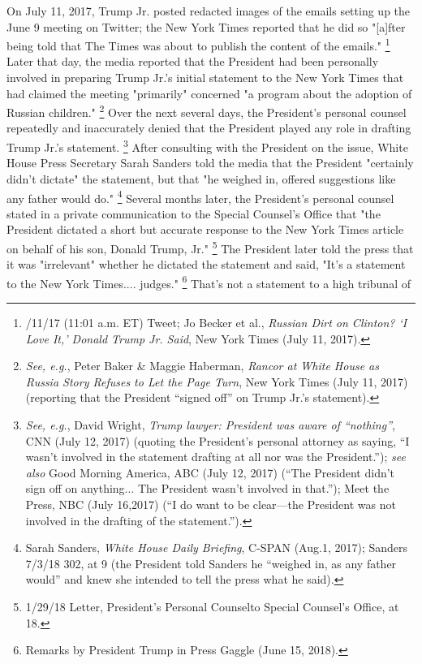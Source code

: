 On July 11, 2017, Trump Jr. posted redacted images of the emails setting up the June 9 meeting on Twitter; the New York Times reported that he did so "[a]fter being told that The Times was about to publish the content of the emails."%
\footnote{/11/17 (11:01 a.m. ET) Tweet;
Jo Becker et al., \textit{Russian Dirt on Clinton? `I Love It,' Donald Trump Jr. Said}, New York Times (July 11, 2017).}
Later that day, the media reported that the President had been personally involved in preparing Trump Jr.'s initial statement to the New York Times that had claimed the meeting "primarily" concerned "a program about the adoption of Russian children."%
\footnote{\textit{See, e.g.}, Peter Baker \& Maggie Haberman, \textit{Rancor at White House as Russia Story Refuses to Let the Page Turn}, New York Times (July 11, 2017) (reporting that the President ``signed off'' on Trump Jr.'s statement).}
Over the next several days, the President's personal counsel repeatedly and inaccurately denied that the President played any role in drafting Trump Jr.'s statement.%
\footnote{\textit{See, e.g.}, David Wright, \textit{Trump lawyer: President was aware of “nothing”}, CNN (July 12, 2017) (quoting the President’s personal attorney as saying, “I wasn’t involved in the statement drafting at all nor was the President.”);
\textit{see also} Good Morning America, ABC (July 12, 2017) (“The President didn’t sign off on anything... The President wasn’t involved in that.”);
Meet the Press, NBC (July 16,2017) (“I do want to be clear—the President was not involved in the drafting of the statement.”).}
After consulting with the President on the issue, White House Press Secretary Sarah Sanders told the media that the President "certainly didn't dictate" the statement, but that "he weighed in, offered suggestions like any father would do."%
\footnote{Sarah Sanders, \textit{White House Daily Briefing}, C-SPAN (Aug.1, 2017);
Sanders 7/3/18 302, at 9 (the President told Sanders he “weighed in, as any father would” and knew she intended to tell the press what he said).}
Several months later, the President's personal counsel stated in a private communication to the Special Counsel's Office that "the President dictated a short but accurate response to the New York Times article on behalf of his son, Donald Trump,
Jr."%
\footnote{1/29/18 Letter, President’s Personal Counselto Special Counsel’s Office, at 18.}
The President later told the press that it was "irrelevant" whether he dictated the statement and said, "It's a statement to the New York Times.... judges."%
\footnote{Remarks by President Trump in Press Gaggle (June 15, 2018).}
That's not a statement to a high tribunal of


